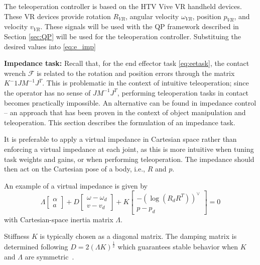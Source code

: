 \documentclass[a4paper, 10pt, conference]{ieeeconf}
\begin{document}
    The teleoperation controller is based on the HTV Vive VR handheld devices. These VR devices provide rotation $R_{VR}$, angular velocity $\omega_{VR}$, position $p_{VR}$, and velocity $v_{VR}$. These signals will be used with the QP framework described in Section \ref{sec:QP} will be used for the teleoperation controller. Substituing the desired values into \ref{eq:e_imp}


     \textbf{Impedance task:} Recall that, for the end effector task \eqref{eq:eetask}, the contact wrench $\mathcal{F}$ is related to the rotation and position errors through the matrix $K^-1JM^{-1}J^T$. This is problematic in the context of intuitive teleoperation; since the operator has no sense of $JM^{-1}J^T$, performing teleoperation tasks in contact becomes practically impossible.
     An alternative can be found in impedance control -- an approach that has been proven in the context of object manipulation and teleoperation. This section describes the formulation of an impedance task.

    It is preferable to apply a virtual impedance in Cartesian space rather than enforcing a virtual impedance at each joint, as this is more intuitive when tuning task weights and gains, or when performing teleoperation. The impedance should then act on the Cartesian pose of a body, i.e., $R$ and $p$. 

     An example of a virtual impedance is given by
         \begin{equation} \label{eq:impedance_desired}
     \Lambda  \begin{bmatrix} \alpha   \\ a  \end{bmatrix} + D \begin{bmatrix} \omega - {\omega_d} \\ v - v_d \end{bmatrix}  + K \begin{bmatrix} -(\log({R}_dR^T))^{\vee } \\p - {p_d}  \end{bmatrix} = 0
     \end{equation}
    with Cartesian-space inertia matrix $\Lambda$. 

    Stiffness $K$ is typically chosen as a diagonal matrix. The damping matrix is determined following $D = 2(\Lambda K)^{\frac{1}{2}}$ which guarantees stable behavior when $K$ and $\Lambda$ are symmetric~\cite{albu-schafferCartesianImpedanceControl2003}. 
\end{document}
